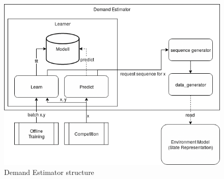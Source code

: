 %


\begin{figure}[h]
    \centering
    \includegraphics[width=0.8\linewidth]{img/UsageEstimator.png}
    \caption{Demand Estimator structure}
    \label{fig:DemandEstimator}
\end{figure}

